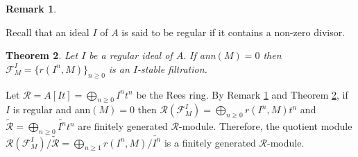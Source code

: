 \documentclass[11pt]{amsart}
\theoremstyle{plain}
\newtheorem{theorem}{Theorem}[section]
\newtheorem{remark}[theorem]{Remark}
\newcommand{\R}{\mathcal{R}}
\newcommand{\F}{\mathcal{F}}
\newcommand{\wt}{\widetilde}
\theoremstyle{plain}
\begin{document}
\begin{remark}
\label{rmk:tildeI^nM}
{}
\end{remark}
Recall that an ideal $I$ of $A$ is said to be regular if it contains a non-zero divisor.
\begin{theorem}\cite[Theorem 5.9]{Zulfeqarr}
  \normalfont
  \label{Thm:Istable}
      Let $I$ be a regular ideal of $A.$ If ann$(M)=0$ then $\mathcal{F}^I_M=\{r(I^n, M)\}_{n\geq 0}$ is an $I$-stable filtration.
  \end{theorem}


 Let $\R=A[It]=\bigoplus_{n\geq 0}I^nt^n$ be the Rees ring. By Remark \ref{rmk:tildeI^nM} and Theorem \ref{Thm:Istable}, if $I$ is regular and ann$(M)=0$ then $\R({\F^I_M})=\bigoplus_{n\geq 0}r(I^n,M)t^n$ and $\wt{\R} =\bigoplus_{n\geq 0}\wt{I^n}t^n$ are finitely generated $\R$-module. Therefore, the quotient module ${\R({\F^I_M})}/{\wt{\R}}=\bigoplus_{n\geq 1}{r(I^n,M)}/{\wt{I^n}}$ is a finitely generated $\R$-module.
\end{document}
